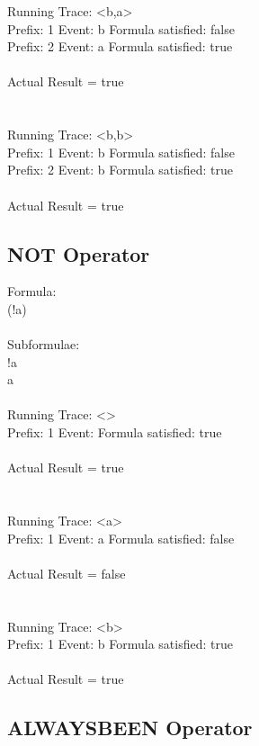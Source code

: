 \noindent Running Trace: \textless b,a\textgreater\\
  Prefix: 1 Event: b Formula satisfied: false\\
  Prefix: 2 Event: a Formula satisfied: true\\
\\
Actual Result = true\\
\\
\\
Running Trace: \textless b,b\textgreater\\
  Prefix: 1 Event: b Formula satisfied: false\\
  Prefix: 2 Event: b Formula satisfied: true\\
\\
Actual Result = true\\

\subsection{NOT Operator}

Formula:\\
(!a)\\
\\
Subformulae:\\
!a\\
a\\
\\
Running Trace: \textless \textgreater\\
  Prefix: 1 Event:  Formula satisfied: true\\
\\
Actual Result = true\\
\\
\\
Running Trace: \textless a\textgreater\\
  Prefix: 1 Event: a Formula satisfied: false\\
\\
Actual Result = false\\
\\
\\
Running Trace: \textless b\textgreater\\
  Prefix: 1 Event: b Formula satisfied: true\\
\\
Actual Result = true\\

\subsection{ALWAYSBEEN Operator}

